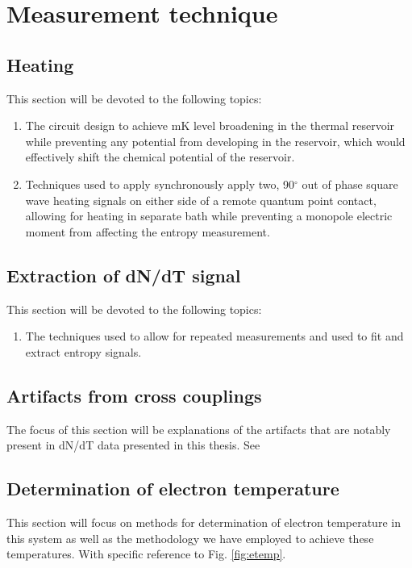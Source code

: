 \chapter{Measurement technique}
\section{Heating}
\label{sec:heating}
This section will be devoted to the following topics:
\begin{enumerate}
	\item The circuit design to achieve mK level broadening in the thermal reservoir while preventing any potential from developing in the reservoir, which would effectively shift the chemical potential of the reservoir.
	\item Techniques used to apply synchronously apply two, 90$^{\circ}$ out of phase square wave heating signals on either side of a remote quantum point contact, allowing for heating in separate bath while preventing a monopole electric moment from affecting the entropy measurement.
\end{enumerate}

\section{Extraction of dN/dT signal}
\label{sec:data_analysis}
This section will be devoted to the following topics:
\begin{enumerate}
	\item The techniques used to allow for repeated measurements and used to fit and extract entropy signals.
\end{enumerate}


\section{Artifacts from cross couplings}
\label{sec:artifacts}
The focus of this section will be explanations of the artifacts that are notably present in dN/dT data presented in this thesis. See 



\section{Determination of electron temperature}
This section will focus on methods for determination of electron temperature in this system as well as the methodology we have employed to achieve these temperatures. With specific reference to Fig. \ref{fig:etemp}.

